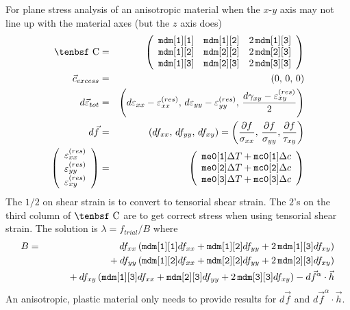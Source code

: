 \documentclass[11pt]{article}
\def\C{\hbox{\tenbsf C}}
\def\cex{\vec{c}_{excess}}
\def\code#1{{\small\tt #1}}
\def\deff{d \vec{\varepsilon}_{tot}}
\def\df{d \vec{f}}
\def\dfa{d \vec{f}^\alpha}
\def\DT{\Delta T}
\def\e#1{\varepsilon_{#1}}
\def\er#1{\varepsilon_{#1}^{(res)}}
\def\g#1{\gamma_{#1}}
\begin{document}
For plane stress analysis of an anisotropic material when the $x$-$y$ axis may not line up with the material axes (but the $z$ axis does)
\begin{eqnarray}
      \C & = & \left(\begin{array}{ccc}
      		\code{mdm[1][1]} & \code{mdm[1][2]} & 2\thinspace\code{mdm[1][3]}  \\
      		\code{mdm[1][2]} & \code{mdm[2][2]} & 2\thinspace\code{mdm[2][3]}  \\
      		\code{mdm[1][3]} & \code{mdm[2][3]} & 2\thinspace\code{mdm[3][3]} 
           \end{array}\right)  \\
      \cex & = & (0, \thinspace 0, \thinspace 0) \\
      \deff & = & \left(d\e{xx} - \er{xx}, \thinspace d\e{yy} - \er{yy}, \thinspace {d\g{xy}-\er{xy}\over 2}\right) \\
      \df & = & (df_{xx}, \thinspace df_{yy}, \thinspace df_{xy})
                  = \left({\partial f\over \sigma_{xx}}, \thinspace {\partial f\over \sigma_{yy}},
                                {\partial f\over \tau_{xy}}\right) \\
       \left(\begin{array}{c} \er{xx} \\ \er{yy} \\ \er{xy} \end{array}\right)
       & = & \left(\begin{array}{c}
	\code{me0[1]}\DT + \code{mc0[1]}\Delta c \\
	\code{me0[2]}\DT + \code{mc0[2]}\Delta c \\
	\code{me0[3]}\DT + \code{mc0[3]}\Delta c  \end{array}\right)
 \end{eqnarray}
 The $1/2$ on shear strain is to convert to tensorial shear strain. The $2$'s on the third column of $\C$  are to get correct stress when using tensorial shear strain. The solution is $\lambda=f_{trial}/B$ where
 \begin{eqnarray}
        B & = &  df_{xx}\left( \code{mdm[1][1]}df_{xx} + \code{mdm[1][2]}df_{yy} 
                                                      + 2\thinspace\code{mdm[1][3]}df_{xy} \right)
 \nonumber\\
 &&\qquad\mbox{}
                           +df_{yy}\left( \code{mdm[1][2]}df_{xx} + \code{mdm[2][2]}df_{yy} 
                                                      + 2\thinspace\code{mdm[2][3]}df_{xy} \right)
\nonumber\\
 &&\qquad\mbox{}
                           + df_{xy}\left(\code{mdm[1][3]}df_{xx} + \code{mdm[2][3]}df_{yy} 
                                                      + 2\thinspace\code{mdm[3][3]}df_{xy} \right) - \dfa \cdot \vec{h}
\end{eqnarray}
An anisotropic, plastic material only needs to provide results for $\df$ and $\dfa\cdot\vec h$.
\end{document}

